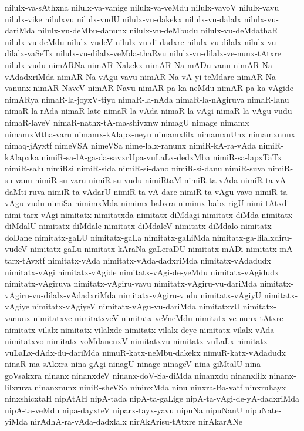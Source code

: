 {nilulx-va-sAthxna
nilulx-va-vanige
nilulx-va-veMdu
nilulx-vavoV
nilulx-vavu
nilulx-vike
nilulxvu
nilulx-vudU
nilulx-vu-dakekx
nilulx-vu-dalalx
nilulx-vu-dariMda
nilulx-vu-deMbu-danunx
nilulx-vu-deMbudu
nilulx-vu-deMdathaR
nilulx-vu-deMdu
nilulx-vudeV
nilulx-vu-di-dadxre
nilulx-vu-dilalx
nilulx-vu-dilalx-vaSeTx
nilulx-vu-dilalx-veMda-thaRvu
nilulx-vu-dilalx-ve-nunx-tAtxre
nilulx-vudu
nimARNa
nimAR-Nakekx
nimAR-Na-mADu-vanu
nimAR-Na-vAdadxriMda
nimAR-Na-vAgu-vavu
nimAR-Na-vA-yi-teMdare
nimAR-Na-vanunx
nimAR-NaveV
nimAR-Navu
nimAR-pa-ka-neMdu
nimAR-pa-ka-vAgide
nimARya
nimaR-la-joyxV-tiyu
nimaR-la-nAda
nimaR-la-nAgiruva
nimaR-lanu
nimaR-la-rAda
nimaR-late
nimaR-la-vAda
nimaR-la-vAgi
nimaR-la-vAgu-vudu
nimaR-laveV
nimaR-nathx-tA-ma-shivxnw
nimagU
nimage
nimamx
nimamxMtha-varu
nimamx-kAlapx-neyu
nimamxlilx
nimamxnUnx
nimamxnunx
nimaq-jAyxtf
nimeVSA
nimeVSa
nime-lalx-ranunx
nimiR-kA-ra-vAda
nimiR-kAlapxka
nimiR-sa-lA-ga-da-savxrUpa-vuLaLx-dedxMba
nimiR-sa-lapxTaTx
nimiR-salu
nimiRsi
nimiR-sida
nimiR-si-dano
nimiR-si-danu
nimiR-suva
nimiR-su-vanu
nimiR-su-varu
nimiR-su-vudu
nimiRtaM
nimiR-ta-vAda
nimiR-ta-vA-daMti-ruva
nimiR-ta-vAdarU
nimiR-ta-vA-dare
nimiR-ta-vAgu-vavo
nimiR-ta-vAgu-vudu
nimiSa
nimimxMda
nimimx-babxra
nimimx-babx-rigU
nimi-tAtxdi
nimi-tarx-vAgi
nimitatx
nimitatxda
nimitatx-diMdagi
nimitatx-diMda
nimitatx-diMdalU
nimitatx-diMdale
nimitatx-diMdaleV
nimitatx-diMdalo
nimitatx-doDane
nimitatx-gaLU
nimitatx-gaLa
nimitatx-gaLiMda
nimitatx-ga-lilalxdiru-vudeV
nimitatx-gaLu
nimitatx-kAraNa-gaLeraDU
nimitatx-mADi
nimitatx-mA-tarx-tAvxtf
nimitatx-vAda
nimitatx-vAda-dadxriMda
nimitatx-vAdadudx
nimitatx-vAgi
nimitatx-vAgide
nimitatx-vAgi-de-yeMdu
nimitatx-vAgidudx
nimitatx-vAgiruva
nimitatx-vAgiru-vavu
nimitatx-vAgiru-vu-dariMda
nimitatx-vAgiru-vu-dilalx-vAdadxriMda
nimitatx-vAgiru-vudu
nimitatx-vAgiyU
nimitatx-vAgiye
nimitatx-vAgiyeV
nimitatx-vAgu-vu-dariMda
nimitatxvU
nimitatx-vanunx
nimitatxve
nimitatxveV
nimitatx-veVneMdu
nimitatx-ve-nunx-tAtxre
nimitatx-vilalx
nimitatx-vilalxde
nimitatx-vilalx-deye
nimitatx-vilalx-vAda
nimitatxvo
nimitatx-voMdanenxV
nimitatxvu
nimitatx-vuLaLx
nimitatx-vuLaLx-dAdx-du-dariMda
nimuR-katx-neMbu-dakekx
nimuR-katx-vAdadudx
ninaR-ma-sAkxra
nina-gAgi
ninagU
ninage
ninageV
nina-giMtalU
nina-goVsakxra
ninanx
ninanxdeV
ninanx-doV-Sa-diMda
ninanxdu
ninanxlilx
ninanx-lilxruva
ninanxnunx
niniR-sheVSa
nininxMda
ninu
ninxra-Ba-vatf
ninxruhayx
ninxshicxtaH
nipAtAH
nipA-tada
nipA-ta-gaLige
nipA-ta-vAgi-de-yA-dadxriMda
nipA-ta-veMdu
nipa-dayxteV
niparx-tayx-yavu
nipuNa
nipuNanU
nipuNate-yiMda
nirAdhA-ra-vAda-dadxlalx
nirAkArisu-tAtxre
nirAkarANe
}
